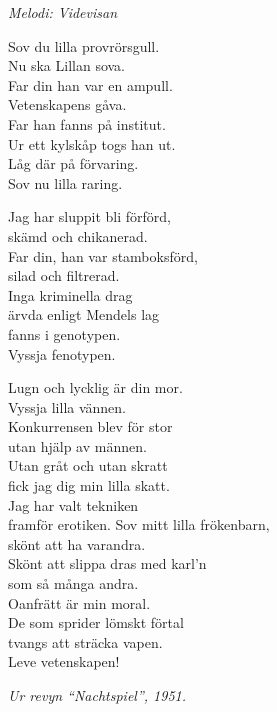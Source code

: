 {\footnotesize\textit{Melodi: Videvisan}}\par
\vspace{10pt}
Sov du lilla provrörsgull.\\
Nu ska Lillan sova.\\
Far din han var en ampull.\\
Vetenskapens gåva.\\
Far han fanns på institut.\\
Ur ett kylskåp togs han ut.\\
Låg där på förvaring.\\
Sov nu lilla raring.\par
\vspace{10pt}
Jag har sluppit bli förförd,\\
skämd och chikanerad.\\
Far din, han var stamboksförd,\\
silad och filtrerad.\\
Inga kriminella drag\\
ärvda enligt Mendels lag\\
fanns i genotypen.\\
Vyssja fenotypen.\par
\vspace{10pt}
Lugn och lycklig är din mor.\\
Vyssja lilla vännen.\\
Konkurrensen blev för stor\\
utan hjälp av männen.\\
Utan gråt och utan skratt\\
fick jag dig min lilla skatt.\\
Jag har valt tekniken\\
framför erotiken.
\newpage
Sov mitt lilla frökenbarn,\\
skönt att ha varandra.\\
Skönt att slippa dras med karl'n\\
som så många andra.\\
Oanfrätt är min moral.\\
De som sprider lömskt förtal\\
tvangs att sträcka vapen.\\
Leve vetenskapen!\par
\vspace{10pt}
{\footnotesize\textit{Ur revyn “Nachtspiel”, 1951.}}

